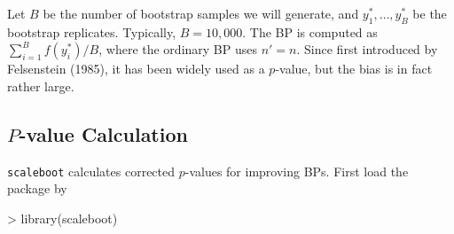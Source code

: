 \documentclass[a4paper]{amsart}
\begin{document}
Let $B$ be the number of bootstrap samples we will generate, and
$y^*_1,\ldots, y^*_B$ be the bootstrap replicates. Typically,
$B=10,000$. The BP is computed as $\sum_{i=1}^B f(y^*_i)/B$, where the
ordinary BP uses $n'=n$.  Since first introduced by Felsenstein
(1985), it has been widely used as a $p$-value, but the bias is in
fact rather large.


\subsection{$P$-value Calculation}

{\tt scaleboot} calculates corrected $p$-values for improving BPs.
First load the package by
\begin{Schunk}
\begin{Sinput}
> library(scaleboot)
\end{Sinput}
\end{Schunk}
\end{document}

